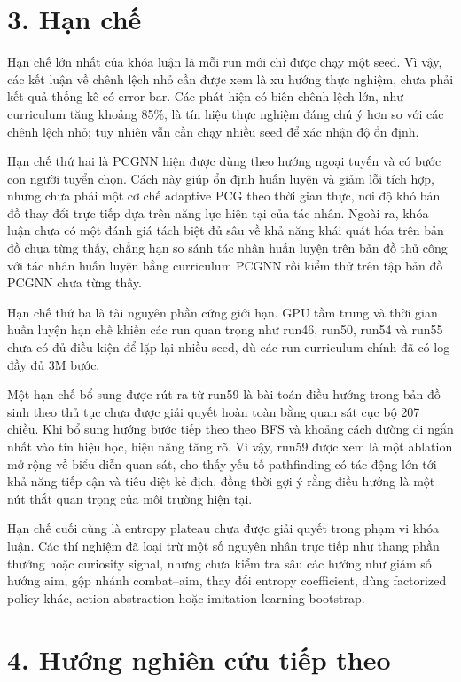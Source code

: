 \section*{3. Hạn chế}

Hạn chế lớn nhất của khóa luận là mỗi run mới chỉ được chạy một seed. Vì vậy, các kết luận về chênh lệch nhỏ cần được xem là xu hướng thực nghiệm, chưa phải kết quả thống kê có error bar. Các phát hiện có biên chênh lệch lớn, như curriculum tăng khoảng 85\%, là tín hiệu thực nghiệm đáng chú ý hơn so với các chênh lệch nhỏ; tuy nhiên vẫn cần chạy nhiều seed để xác nhận độ ổn định.

Hạn chế thứ hai là PCGNN hiện được dùng theo hướng ngoại tuyến và có bước con người tuyển chọn. Cách này giúp ổn định huấn luyện và giảm lỗi tích hợp, nhưng chưa phải một cơ chế adaptive PCG theo thời gian thực, nơi độ khó bản đồ thay đổi trực tiếp dựa trên năng lực hiện tại của tác nhân. Ngoài ra, khóa luận chưa có một đánh giá tách biệt đủ sâu về khả năng khái quát hóa trên bản đồ chưa từng thấy, chẳng hạn so sánh tác nhân huấn luyện trên bản đồ thủ công với tác nhân huấn luyện bằng curriculum PCGNN rồi kiểm thử trên tập bản đồ PCGNN chưa từng thấy.

Hạn chế thứ ba là tài nguyên phần cứng giới hạn. GPU tầm trung và thời gian huấn luyện hạn chế khiến các run quan trọng như run46, run50, run54 và run55 chưa có đủ điều kiện để lặp lại nhiều seed, dù các run curriculum chính đã có log đầy đủ 3M bước.

Một hạn chế bổ sung được rút ra từ run59 là bài toán điều hướng trong bản đồ sinh theo thủ tục chưa được giải quyết hoàn toàn bằng quan sát cục bộ 207 chiều. Khi bổ sung hướng bước tiếp theo theo BFS và khoảng cách đường đi ngắn nhất vào tín hiệu học, hiệu năng tăng rõ. Vì vậy, run59 được xem là một ablation mở rộng về biểu diễn quan sát, cho thấy yếu tố pathfinding có tác động lớn tới khả năng tiếp cận và tiêu diệt kẻ địch, đồng thời gợi ý rằng điều hướng là một nút thắt quan trọng của môi trường hiện tại.

Hạn chế cuối cùng là entropy plateau chưa được giải quyết trong phạm vi khóa luận. Các thí nghiệm đã loại trừ một số nguyên nhân trực tiếp như thang phần thưởng hoặc curiosity signal, nhưng chưa kiểm tra sâu các hướng như giảm số hướng aim, gộp nhánh combat--aim, thay đổi entropy coefficient, dùng factorized policy khác, action abstraction hoặc imitation learning bootstrap.

\section*{4. Hướng nghiên cứu tiếp theo}

